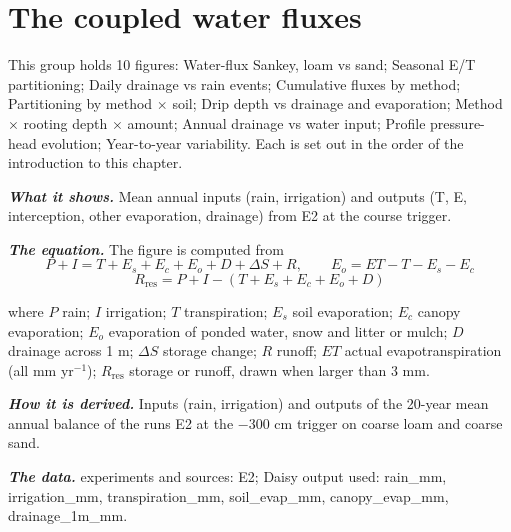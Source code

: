 \section{The coupled water fluxes}
This group holds 10 figures: Water-flux Sankey, loam vs sand; Seasonal E/T partitioning; Daily drainage vs rain events; Cumulative fluxes by method; Partitioning by method $\times$ soil; Drip depth vs drainage and evaporation; Method $\times$ rooting depth $\times$ amount; Annual drainage vs water input; Profile pressure-head evolution; Year-to-year variability. Each is set out in the order of the introduction to this chapter.
\par\vspace{6pt}\noindent{}\par\nobreak
{}\label{fig:a19_14}
\par\noindent\textbf{\color{khmag}\emph{What it shows.}} Mean annual inputs (rain, irrigation) and outputs (T, E, interception, other evaporation, drainage) from E2 at the course trigger.
\par\noindent\textbf{\color{khmag}\emph{The equation.}} The figure is computed from
\begin{equation}\boxed{P+I=T+E_s+E_c+E_o+D+\Delta S+R,\qquad E_o=ET-T-E_s-E_c}\end{equation}
\begin{equation}\boxed{R_{\mathrm{res}}=P+I-(T+E_s+E_c+E_o+D)}\end{equation}
\par\noindent where $P$ rain; $I$ irrigation; $T$ transpiration; $E_s$ soil evaporation; $E_c$ canopy evaporation; $E_o$ evaporation of ponded water, snow and litter or mulch; $D$ drainage across 1 m; $\Delta S$ storage change; $R$ runoff; $ET$ actual evapotranspiration (all mm yr$^{-1}$); $R_{\mathrm{res}}$ storage or runoff, drawn when larger than 3 mm.
\par\noindent\textbf{\color{khmag}\emph{How it is derived.}} Inputs (rain, irrigation) and outputs of the 20-year mean annual balance of the runs E2 at the $-300$ cm trigger on coarse loam and coarse sand.
\par\noindent\textbf{\color{khmag}\emph{The data.}} experiments and sources: E2; Daisy output used: rain\_mm, irrigation\_mm, transpiration\_mm, soil\_evap\_mm, canopy\_evap\_mm, drainage\_1m\_mm.
\par\vspace{6pt}\noindent{}\par\nobreak
